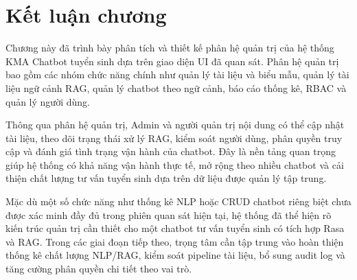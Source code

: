 \section{Kết luận chương}

Chương này đã trình bày phân tích và thiết kế phân hệ quản trị của hệ thống KMA Chatbot tuyển sinh dựa trên giao diện UI đã quan sát. Phân hệ quản trị bao gồm các nhóm chức năng chính như quản lý tài liệu và biểu mẫu, quản lý tài liệu ngữ cảnh RAG, quản lý chatbot theo ngữ cảnh, báo cáo thống kê, RBAC và quản lý người dùng.

Thông qua phân hệ quản trị, Admin và người quản trị nội dung có thể cập nhật tài liệu, theo dõi trạng thái xử lý RAG, kiểm soát người dùng, phân quyền truy cập và đánh giá tình trạng vận hành của chatbot. Đây là nền tảng quan trọng giúp hệ thống có khả năng vận hành thực tế, mở rộng theo nhiều chatbot và cải thiện chất lượng tư vấn tuyển sinh dựa trên dữ liệu được quản lý tập trung.

Mặc dù một số chức năng như thống kê NLP hoặc CRUD chatbot riêng biệt chưa được xác minh đầy đủ trong phiên quan sát hiện tại, hệ thống đã thể hiện rõ kiến trúc quản trị cần thiết cho một chatbot tư vấn tuyển sinh có tích hợp Rasa và RAG. Trong các giai đoạn tiếp theo, trọng tâm cần tập trung vào hoàn thiện thống kê chất lượng NLP/RAG, kiểm soát pipeline tài liệu, bổ sung audit log và tăng cường phân quyền chi tiết theo vai trò.
